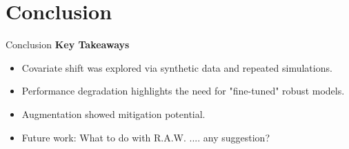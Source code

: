 \section{Conclusion}
\begin{frame}{Conclusion}
    \centering
    \Large
    \textbf{Key Takeaways}
    \vspace{0.5em}
    \begin{itemize}
        \item Covariate shift was explored via synthetic data and repeated simulations.
        \item Performance degradation highlights the need for "fine-tuned" robust models.
        \item Augmentation showed mitigation potential.
        \item Future work: What to do with R.A.W. .... any suggestion?
    \end{itemize}
\end{frame}
